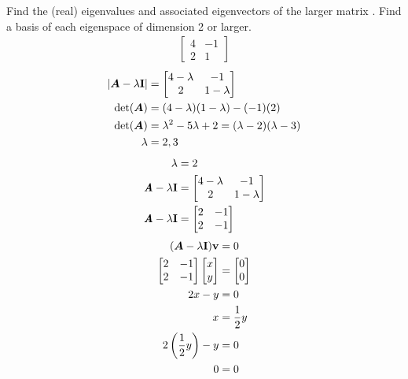 \documentclass{article}
\begin{document}
Find the (real) eigenvalues and associated eigenvectors of the larger matrix . Find a basis of each eigenspace of dimension 2 or larger.
\begin{align*}
	\begin{bmatrix} 4 & -1 \\ 2 & 1 \end{bmatrix}
\end{align*}
\begin{align*}
	|\matr{A} - \lambda \vect{I}| & =
		\begin{bmatrix}
			4 - \lambda & -1 \\
			2 & 1 - \lambda
		\end{bmatrix} \\
	\det(\matr{A}) & = (4 - \lambda)(1 - \lambda) - (-1)(2) \\
	\det(\matr{A}) & = \lambda^2 - 5\lambda + 2 = (\lambda - 2)(\lambda - 3) \\
	\lambda & = 2, 3
\end{align*}
\begin{align*}
	\lambda & = 2 \\
	\matr{A} - \lambda \vect{I} & =
		\begin{bmatrix}
			4 - \lambda & -1 \\
			2 & 1 - \lambda
		\end{bmatrix} \\
	\matr{A} - \lambda \vect{I} & =
		\begin{bmatrix}
			2 & -1 \\
			2 & -1
		\end{bmatrix}
\end{align*}
\begin{align*}
	(\matr{A} - \lambda \vect{I})\vect{v} & = 0 \\
	\begin{bmatrix} 2 & -1 \\ 2 & -1 \end{bmatrix}
	\begin{bmatrix} x \\ y \end{bmatrix} & =
	\begin{bmatrix} 0 \\ 0 \end{bmatrix} \\
	2x - y & = 0 \\
	x & = \frac{1}{2}y \\
	2 \left( \frac{1}{2}y \right) - y & = 0 \\
	0 & = 0
\end{align*}
\end{document}
